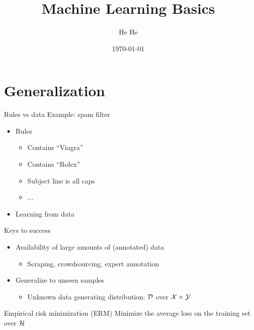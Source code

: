 \documentclass[usenames,dvipsnames,notes]{beamer}
\title[CSCI-GA.2590]{Machine Learning Basics}
\author[He He]{He He
}
\institute[NYU]{New York University}
\date{\today}
\begin{document}
\begin{frame}
\titlepage
\end{frame}

\section{Generalization}

\begin{frame}
    {Rules vs data}
    Example: spam filter
    \begin{itemize}
        \itemsep1em
        \item Rules
            \begin{itemize}
                \item[] Contains ``Viagra''
                \item[] Contains ``Rolex''
                \item[] Subject line is all caps
                \item[] ... 
            \end{itemize}
        \item Learning from data
            \vspace{5em}
    \end{itemize}
\end{frame}

\begin{frame}
    {Keys to success}
    \begin{itemize}
        \itemsep1em
        \item Availability of large amounts of (annotated) data
            \begin{itemize}
                \item[] Scraping, crowdsourcing, expert annotation
            \end{itemize}
        \item Generalize to unseen samples
            \begin{itemize}
                \item[] \alert{Unknown} data generating distribution: $\mathcal{D}$ over $\mathcal{X}\times\mathcal{Y}$
                \vspace{5em}
            \end{itemize}
    \end{itemize}
\end{frame}

\begin{frame}
    {Empirical risk minimization (ERM)}
    Minimize the average loss on the training set over $\mathcal{H}$
    \vspace{10em}
\end{frame}
\end{document}
